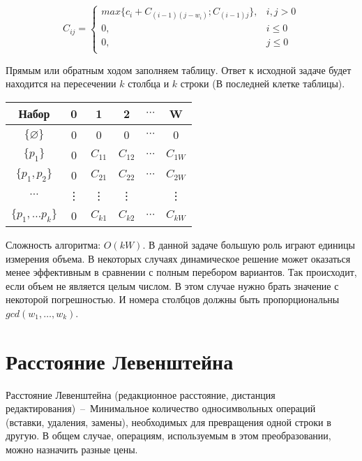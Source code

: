 \documentclass[a4paper,12pt] {report} 			%
\begin{document}
\begin{center}
	\begin{equation*}
	C_{ij} =
		\begin{cases}
			max \{ c_{i} + C_{(i - 1)(j - w_{i})}; C_{(i - 1)j} \}, & \text{$i,j > 0$} \\
			0, & \text{$i \leq 0$} \\
			0, & \text{$j \leq 0$} \\
		\end{cases}
	\end{equation*}
\end{center}

Прямым или обратным ходом заполняем таблицу. Ответ к исходной задаче 
будет находится на пересечении $k$ столбца и $k$ строки (В последней клетке таблицы).

\begin{center}
	\begin{tabular}{ | c | c c c c c | }
		\hline
		Набор & 0 & 1 & 2 & $\cdots$ & W \\
		\hline
		$\{ \varnothing \}$ & 0 & 0 & 0 & $\cdots$ & 0 \\
		$\{ p_{1} \}$ & 0 & $C_{11}$ & $C_{12}$ & $\cdots$ & $C_{1W}$ \\
		$\{ p_{1},p_{2} \}$ & 0 & $C_{21}$  & $C_{22}$ & $\cdots$ & $C_{2W}$ \\
		$\cdots$ & \vdots & \vdots & \vdots &  & \vdots \\
		$\{ p_{1}, \ldots p_{k} \}$ & 0 & $C_{k1}$ & $C_{k2}$ & $\cdots$ & $C_{kW}$ \\
		\hline
	\end{tabular}
\end{center}

Сложность алгоритма: $O(kW)$. В данной задаче большую роль играют единицы измерения объема. 
В некоторых случаях динамическое решение может оказаться менее эффективным в сравнении с полным перебором 
вариантов. Так происходит, если объем не является целым числом. В этом случае нужно брать 
значение с некоторой погрешностью. И номера столбцов должны быть пропорциональны $gcd(w_{1}, \ldots , w_{k})$.

\section{Расстояние Левенштейна}

Расстояние Левенштейна (редакционное расстояние, дистанция редактирования)~--~Минимальное количество односимвольных 
операций (вставки, удаления, замены), необходимых для превращения одной строки в другую.
В общем случае, операциям, используемым в этом преобразовании, можно назначить разные цены. 
\end{document}

